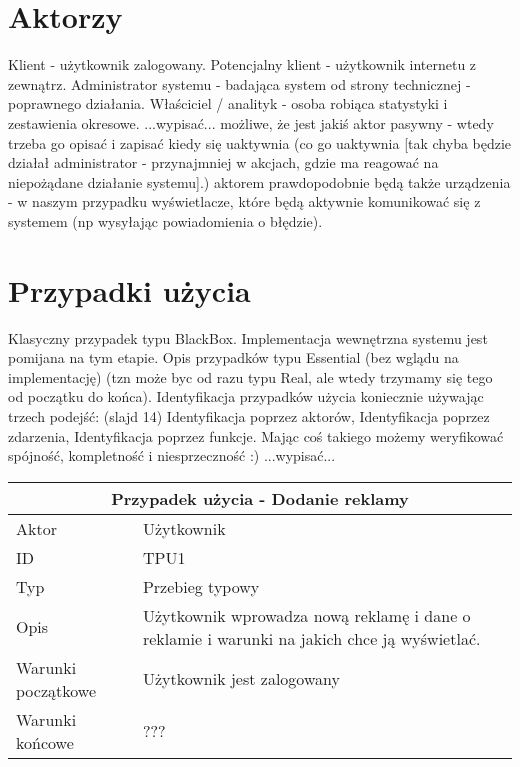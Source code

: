 \documentclass[a4paper,titlepage,twoside,openright]{report} %
\begin{document}
		\section{Aktorzy}
		Klient - użytkownik zalogowany.\newline
		Potencjalny klient - użytkownik internetu z zewnątrz.\newline
		Administrator systemu - badająca system od strony technicznej - poprawnego działania.\newline
		Właściciel / analityk - osoba robiąca statystyki i zestawienia okresowe.\newline
		...wypisać...\newline
		możliwe, że jest jakiś aktor pasywny - wtedy trzeba go opisać i zapisać kiedy się uaktywnia (co go uaktywnia [tak chyba będzie działał administrator - przynajmniej w akcjach, gdzie ma reagować na niepożądane działanie systemu].)\newline
		aktorem prawdopodobnie będą także urządzenia - w naszym przypadku wyświetlacze, które będą aktywnie komunikować się z systemem (np wysyłając powiadomienia o błędzie).\newline
		\section{Przypadki użycia}
		Klasyczny przypadek typu BlackBox. Implementacja wewnętrzna systemu jest pomijana na tym etapie. Opis przypadków typu Essential (bez wglądu na implementację) (tzn może byc od razu typu Real, ale wtedy trzymamy się tego od początku do końca).\newline
		Identyfikacja przypadków użycia koniecznie używając trzech podejść: (slajd 14)\newline
		Identyfikacja poprzez aktorów,\newline
		Identyfikacja poprzez zdarzenia,\newline
		Identyfikacja poprzez funkcje.\newline
		\newline
		Mając coś takiego możemy weryfikować spójność, kompletność i niesprzeczność :)\newline
		...wypisać...\newline
		\begin {center}
		\begin{tabular}{|l|p{10cm}|}
		  \hline
		  \multicolumn{2}{|c|}{\bf Przypadek użycia - Dodanie reklamy}\\\hline
		  \hline
		  Aktor & Użytkownik \\ \hline
		  ID & TPU1 \\ \hline
		  Typ & Przebieg typowy \\ \hline
		  Opis & Użytkownik wprowadza nową reklamę i dane o reklamie i warunki na jakich chce ją wyświetlać. \\ \hline
		  Warunki początkowe & Użytkownik jest zalogowany \\ \hline
		  Warunki końcowe & ??? \\
		  \hline
		\end{tabular}
		\end{center}
\end{document}
